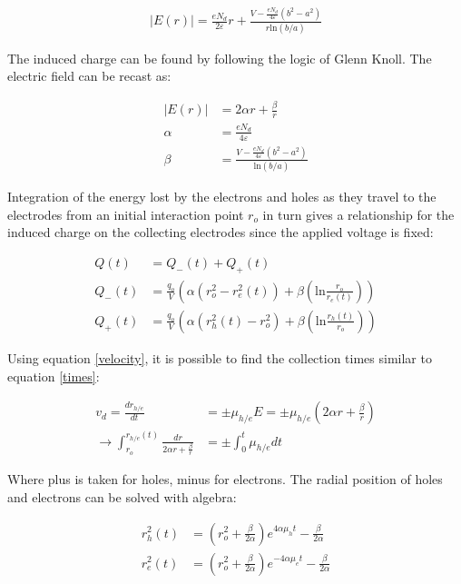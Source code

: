 \begin{align}
    |E(r)| = \frac{e N_{d}}{2 \varepsilon} r + \frac{V-\frac{e N_{d}}{4\varepsilon}(b^2-a^2)}{r \mathrm{ln}(b/a)}
\end{align}

The induced charge can be found by following the logic of Glenn Knoll.\cite{knoll} The electric field can be recast as: 

\begin{align}
    |E(r)| &= 2\alpha r + \frac{\beta}{r} \label{e_simplified}\\
    \alpha &= \frac{e N_{d}}{4\varepsilon} \nonumber\\
    \beta &= \frac{V-\frac{e N_{d}}{4\varepsilon}(b^2-a^2)}{\mathrm{ln}(b/a)} \nonumber
\end{align}

Integration of the energy lost by the electrons and holes as they travel to the electrodes from an initial interaction point $r_{o}$ in turn gives a relationship for the induced charge on the collecting electrodes since the applied voltage is fixed:

\begin{align}
    Q(t) &= Q_{-}(t) + Q_{+}(t)\\
    Q_{-}(t) &= \frac{q_o}{V} \left(\alpha (r_{o}^2 - r_e^2(t)) + \beta \left(\mathrm{ln}\frac{r_{o}}{r_{e}(t)}\right)\right)\\
     Q_{+}(t) &= \frac{q_o}{V} \left(\alpha (r_{h}^2(t) - r_{o}^2) + \beta \left(\mathrm{ln}\frac{r_{h}(t)}{r_{o}}\right)\right)
\end{align}

Using equation \ref{velocity}, it is possible to find the collection times similar to equation \ref{times}:

\begin{align}
    v_{d} = \frac{dr_{h/e}}{dt} &= \pm \mu_{h/e} E = \pm \mu_{h/e} (2\alpha r + \frac{\beta}{r})\\
    \rightarrow \int_{r_{o}}^{r_{h/e}(t)} \frac{dr}{2\alpha r + \frac{\beta}{r}}&= \pm \int_{0}^{t} \mu_{h/e} dt 
\end{align}

Where plus is taken for holes, minus for electrons. The radial position of holes and electrons can be solved with algebra:

\begin{align}
    r_{h}^2(t) &= \left(r_{o}^2 + \frac{\beta}{2\alpha}\right)e^{4\alpha \mu_{h} t} - \frac{\beta}{2 \alpha}\\
    r_{e}^2(t) &= \left(r_{o}^2 + \frac{\beta}{2\alpha}\right)e^{-4\alpha \mu_{e} t} - \frac{\beta}{2 \alpha}
\end{align}

